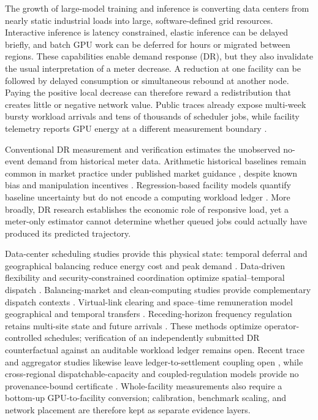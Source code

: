 \documentclass[10pt,journal]{IEEEtran}
\begin{document}
The growth of large-model training and inference is converting data centers
from nearly static industrial loads into large, software-defined grid
resources. Interactive inference is latency constrained, elastic inference can
be delayed briefly, and batch GPU work can be deferred for hours or migrated
between regions. These capabilities enable
demand response (DR), but they also
invalidate the usual interpretation of a meter decrease. A reduction at one
facility can be followed by delayed consumption or simultaneous rebound at
another node. Paying the positive local decrease can therefore reward a
redistribution that creates little or negative network value.
Public traces already expose multi-week bursty workload arrivals and tens of
thousands of scheduler jobs, while facility telemetry reports GPU energy at a
different measurement boundary \cite{wang2024burstgpt,samsi2021supercloud}.

Conventional DR measurement and verification estimates the unobserved
no-event demand from historical meter data. Arithmetic historical baselines
remain common in market practice under published market guidance
\cite{caiso2017baseline}, despite known bias and manipulation incentives
\cite{wang2022baseline}. Regression-based facility models quantify
baseline uncertainty but do not encode a computing workload ledger
\cite{wang2022baseline}. More broadly, DR
research establishes the economic role of responsive load, yet a meter-only
estimator cannot determine whether queued jobs could actually have produced
its predicted trajectory.

Data-center scheduling studies provide this physical state: temporal deferral
and geographical balancing reduce energy cost and peak demand
\cite{liu2013dcdr,adnan2012geographical}. Data-driven flexibility and
security-constrained coordination optimize spatial--temporal dispatch
\cite{cao2022flexibility,cao2024nonwire}. Balancing-market and clean-computing
studies provide complementary dispatch contexts
\cite{takci2025flexibility,riepin2025clean}. Virtual-link clearing and
space--time remuneration model geographical and temporal transfers
\cite{zhang2020virtuallinks,zhang2022remunerating}. Receding-horizon frequency
regulation retains multi-site state and future arrivals
\cite{zhang2023receding}. These
methods optimize operator-controlled schedules; verification of an independently
submitted DR counterfactual against an auditable workload ledger remains open.
Recent trace and aggregator studies likewise leave ledger-to-settlement coupling
open \cite{dcaopt2024,caprara2026}, while cross-regional dispatchable-capacity
and coupled-regulation models provide no provenance-bound certificate
\cite{han2026dispatchable,chen2021idccoupling}. Whole-facility measurements
also require a bottom-up GPU-to-facility conversion; calibration, benchmark
scaling, and network placement are therefore kept as separate evidence layers.
\end{document}
